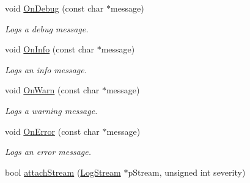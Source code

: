 \begin{DoxyCompactItemize}
\item 
\hypertarget{class_assimp_1_1_null_logger_af354ebbd382b7097a55d364794a45631}{void \hyperlink{class_assimp_1_1_null_logger_af354ebbd382b7097a55d364794a45631}{On\+Debug} (const char $\ast$message)}\label{class_assimp_1_1_null_logger_af354ebbd382b7097a55d364794a45631}

\begin{DoxyCompactList}\small\item\em Logs a debug message. \end{DoxyCompactList}\item 
\hypertarget{class_assimp_1_1_null_logger_a12d2b0048d17a819c8c00277ad1394c5}{void \hyperlink{class_assimp_1_1_null_logger_a12d2b0048d17a819c8c00277ad1394c5}{On\+Info} (const char $\ast$message)}\label{class_assimp_1_1_null_logger_a12d2b0048d17a819c8c00277ad1394c5}

\begin{DoxyCompactList}\small\item\em Logs an info message. \end{DoxyCompactList}\item 
\hypertarget{class_assimp_1_1_null_logger_a9a04c2b9e3d4bc9eec8f693ed8115f24}{void \hyperlink{class_assimp_1_1_null_logger_a9a04c2b9e3d4bc9eec8f693ed8115f24}{On\+Warn} (const char $\ast$message)}\label{class_assimp_1_1_null_logger_a9a04c2b9e3d4bc9eec8f693ed8115f24}

\begin{DoxyCompactList}\small\item\em Logs a warning message. \end{DoxyCompactList}\item 
\hypertarget{class_assimp_1_1_null_logger_a4fbf66103757fafcff891fb04b4ee714}{void \hyperlink{class_assimp_1_1_null_logger_a4fbf66103757fafcff891fb04b4ee714}{On\+Error} (const char $\ast$message)}\label{class_assimp_1_1_null_logger_a4fbf66103757fafcff891fb04b4ee714}

\begin{DoxyCompactList}\small\item\em Logs an error message. \end{DoxyCompactList}\item 
\hypertarget{class_assimp_1_1_null_logger_a31c05ecaee392b5fd34fd2dfd1cca559}{bool \hyperlink{class_assimp_1_1_null_logger_a31c05ecaee392b5fd34fd2dfd1cca559}{attach\+Stream} (\hyperlink{class_assimp_1_1_log_stream}{Log\+Stream} $\ast$p\+Stream, unsigned int severity)}\label{class_assimp_1_1_null_logger_a31c05ecaee392b5fd34fd2dfd1cca559}


\end{DoxyCompactItemize}
